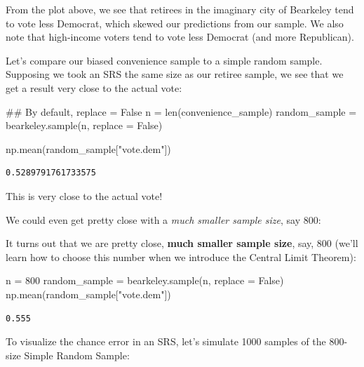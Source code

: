 \documentclass[
  letterpaper,
  DIV=11,
  numbers=noendperiod]{scrreprt}
\newenvironment{Shaded}{\begin{snugshade}}{\end{snugshade}}
\newcommand{\BuiltInTok}[1]{\textcolor[rgb]{0.00,0.23,0.31}{#1}}
\newcommand{\CommentTok}[1]{\textcolor[rgb]{0.37,0.37,0.37}{#1}}
\newcommand{\DecValTok}[1]{\textcolor[rgb]{0.68,0.00,0.00}{#1}}
\newcommand{\NormalTok}[1]{\textcolor[rgb]{0.00,0.23,0.31}{#1}}
\newcommand{\OperatorTok}[1]{\textcolor[rgb]{0.37,0.37,0.37}{#1}}
\newcommand{\StringTok}[1]{\textcolor[rgb]{0.13,0.47,0.30}{#1}}
\newcommand{\VariableTok}[1]{\textcolor[rgb]{0.07,0.07,0.07}{#1}}
\begin{document}
From the plot above, we see that retirees in the imaginary city of
Bearkeley tend to vote less Democrat, which skewed our predictions from
our sample. We also note that high-income voters tend to vote less
Democrat (and more Republican).

Let's compare our biased convenience sample to a simple random sample.
Supposing we took an SRS the same size as our retiree sample, we see
that we get a result very close to the actual vote:

\begin{Shaded}
\begin{Highlighting}[]
\CommentTok{\#\# By default, replace = False}
\NormalTok{n }\OperatorTok{=} \BuiltInTok{len}\NormalTok{(convenience\_sample)}
\NormalTok{random\_sample }\OperatorTok{=}\NormalTok{ bearkeley.sample(n, replace }\OperatorTok{=} \VariableTok{False}\NormalTok{)}

\NormalTok{np.mean(random\_sample[}\StringTok{"vote.dem"}\NormalTok{])}
\end{Highlighting}
\end{Shaded}

\begin{verbatim}
0.5289791761733575
\end{verbatim}

This is very close to the actual vote!

We could even get pretty close with a \emph{much smaller sample size},
say 800:

It turns out that we are pretty close, \textbf{much smaller sample
size}, say, 800 (we'll learn how to choose this number when we introduce
the Central Limit Theorem):

\begin{Shaded}
\begin{Highlighting}[]
\NormalTok{n }\OperatorTok{=} \DecValTok{800}
\NormalTok{random\_sample }\OperatorTok{=}\NormalTok{ bearkeley.sample(n, replace }\OperatorTok{=} \VariableTok{False}\NormalTok{)}
\NormalTok{np.mean(random\_sample[}\StringTok{"vote.dem"}\NormalTok{])}
\end{Highlighting}
\end{Shaded}

\begin{verbatim}
0.555
\end{verbatim}

To visualize the chance error in an SRS, let's simulate 1000 samples of
the 800-size Simple Random Sample:
\end{document}
